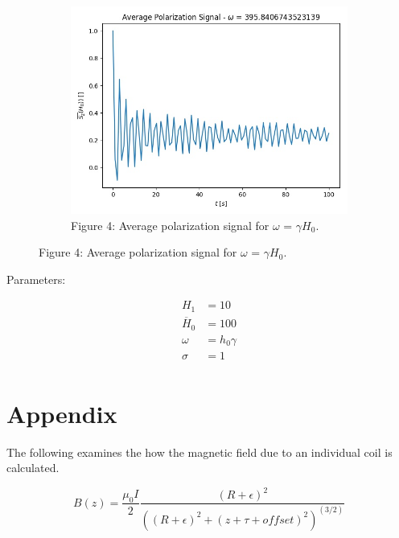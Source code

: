 \documentclass[%
 reprint,
 amsmath,
 amssymb,
 aps,
]{revtex4-1}
\begin{document}
	\begin{figure}

   		\centering
    		\begin{subfigure}[h]{0.4\textwidth}
      	 		\includegraphics[width=\textwidth]{average_signal.jpg}
       	 		\caption{Figure 4: Average polarization signal for $\omega$ = $\gamma H_0$.}
       	 		\label{fig:tiger}
		\end{subfigure}

	\end{figure}
	
		Parameters:

	\begin{align} 
	H_1 &= 10 \\
	\overline{H}_0 &= 100 \\
	\omega &= h_0 \gamma  \\
	\sigma &= 1 \\
	\end{align}

	
	
\section{\label{sec:level1}Appendix}
	
	The following examines the how the magnetic field due to an individual coil is calculated. 
	
	\begin{equation}
	B(z) = \frac{\mu_0I}{2}\frac{(R+\epsilon)^2} {((R+\epsilon)^2+(z+\tau + offset)^2)^{(3/2)}}
	\end{equation}
	
\end{document}
